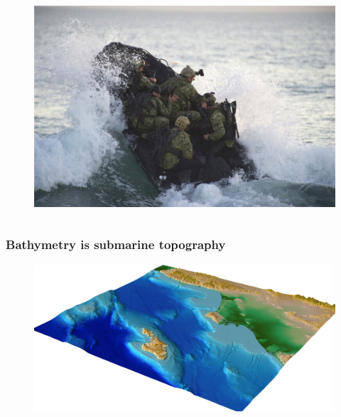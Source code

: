 \documentclass[7pt]{beamer}
\begin{document}
\begin{frame}
\begin{columns}
\begin{figure}
          \includegraphics[width=1\linewidth]{img/Navy_S.jpg}
        \end{figure}
      \end{columns}
    \end{frame}


    \begin{frame}
      \frametitle{Bathymetry is submarine topography}
      \begin{figure}[h]
        \includegraphics[width=1.\linewidth]{img/bath_topo_example.png}\hfill
      \end{figure}
    \end{frame}
\end{document}
